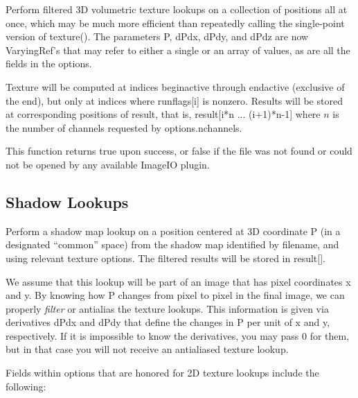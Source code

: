 Perform filtered 3D volumetric texture lookups on a collection of positions all at
once, which may be much more efficient than repeatedly calling the
single-point version of {\cf texture()}.  The parameters {\cf P},
{\cf dPdx}, {\cf dPdy}, and {\cf dPdz} are now
{\cf VaryingRef}'s that may refer to either a single or an array of
values, as are all the fields in the {\cf options}.

Texture will be computed at indices {\cf beginactive} through
{\cf endactive} (exclusive of the end), but only at indices where {\cf runflags[i]}
is nonzero.  Results will be stored at corresponding positions of
{\cf result}, that is, {\cf result[i*n ... (i+1)*n-1]} where $n$ 
is the number of channels requested by {\cf options.nchannels}.

This function returns {\cf true} upon success, or {\cf false} if the
file was not found or could not be opened by any available ImageIO
plugin.
\apiend

\subsection{Shadow Lookups}
\label{sec:texturesys:api:shadow}


Perform a shadow map lookup on a position centered at 3D
coordinate {\cf P} (in a designated ``common'' space) from the shadow map identified by
{\cf filename}, and using relevant texture {\cf options}.  The filtered
results will be stored in {\cf result[]}.

We assume that this lookup will be part of an image that has pixel
coordinates {\cf x} and {\cf y}.  By knowing how {\cf P} changes from
pixel to pixel in the final image, we can properly \emph{filter} or
antialias the texture lookups.  This information is given via
derivatives {\cf dPdx} and {\cf dPdy} that define the changes in {\cf P}
per unit of {\cf x} and {\cf y}, respectively.  If it is impossible to
know the derivatives, you may pass 0 for them, but in that case you will
not receive an antialiased texture lookup.

Fields within {\cf options} that are honored for 2D texture lookups
include the following:

